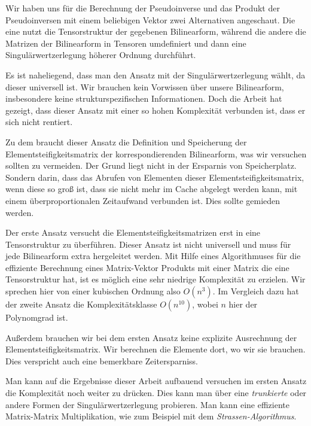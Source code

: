 Wir haben uns für die Berechnung der Pseudoinverse und das Produkt der Pseudoinversen mit einem beliebigen Vektor zwei Alternativen angeschaut. Die eine nutzt die Tensorstruktur der gegebenen Bilinearform, während die andere die Matrizen der Bilinearform in Tensoren umdefiniert und dann eine Singulärwertzerlegung höherer Ordnung durchführt.

Es ist naheliegend, dass man den Ansatz mit der Singulärwertzerlegung wählt, da dieser universell ist. Wir brauchen kein Vorwissen über unsere Bilinearform, insbesondere keine strukturspezifischen Informationen.
Doch die Arbeit hat gezeigt, dass dieser Ansatz mit einer so hohen Komplexität verbunden ist, dass er sich nicht rentiert.

Zu dem braucht dieser Ansatz die Definition und Speicherung der Elementsteifigkeitsmatrix der korrespondierenden Bilinearform, was wir versuchen sollten zu vermeiden. Der Grund liegt nicht in der Ersparnis von Speicherplatz. Sondern darin, dass das Abrufen von Elementen dieser Elementsteifigkeitsmatrix, wenn diese so groß ist, dass sie nicht mehr im Cache abgelegt werden kann, mit einem überproportionalen Zeitaufwand verbunden ist. Dies sollte gemieden werden.

Der erste Ansatz versucht die Elementsteifigkeitsmatrizen erst in eine Tensorstruktur zu überführen. Dieser Ansatz ist nicht universell und muss für jede Bilinearform extra hergeleitet werden. Mit Hilfe eines Algorithmuses für die effiziente Berechnung eines Matrix-Vektor Produkts mit einer Matrix die eine Tensorstruktur hat, ist es möglich eine sehr niedrige Komplexität zu erzielen. Wir sprechen hier von einer kubischen Ordnung also $O(n^3)$. Im Vergleich dazu hat der zweite Ansatz die Komplexitätsklasse $O(n^{10})$, wobei $n$ hier der Polynomgrad ist.

Außerdem brauchen wir bei dem ersten Ansatz keine explizite Ausrechnung der Elementsteifigkeitsmatrix. Wir berechnen die Elemente dort, wo wir sie brauchen. Dies verspricht auch eine bemerkbare Zeitersparniss.

Man kann auf die Ergebnisse dieser Arbeit aufbauend versuchen im ersten Ansatz die Komplexität noch weiter zu drücken. Dies kann man über eine \textit{trunkierte} oder andere Formen der Singulärwertzerlegung probieren. Man kann eine effiziente Matrix-Matrix Multiplikation, wie zum Beispiel mit dem \textit{Strassen-Algorithmus}.
